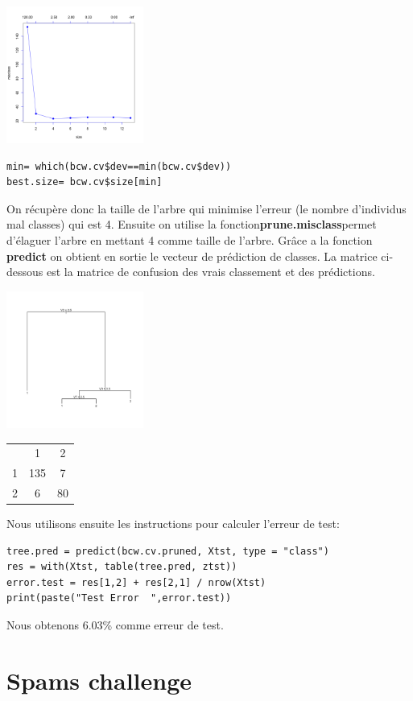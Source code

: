 \documentclass[10pt]{article}
\begin{document}
\begin{minipage}{.4\textwidth}
	\includegraphics[width=45mm]{Figures/bcw_cvplot.png}
\end{minipage}%
\hspace{0.01\linewidth}
\begin{minipage}{.65\textwidth}
 \begin{lstlisting}
min= which(bcw.cv$dev==min(bcw.cv$dev))
best.size= bcw.cv$size[min]
 \end{lstlisting}
\end{minipage}
On récupère donc la taille de l'arbre qui minimise l'erreur (le nombre d'individus mal classes) qui est 4. Ensuite on utilise la fonction\textbf{prune.misclass}permet d’élaguer l’arbre en mettant 4 comme taille de l'arbre. Grâce a la fonction \textbf{predict} on obtient en sortie le vecteur de prédiction de classes. La matrice ci-dessous est la matrice de confusion des vrais classement et des prédictions.
\begin{minipage}{.5\textwidth}
	\includegraphics[width=45mm]{Figures/bcw_prunedtree.png}
\end{minipage}%
\hspace{0.00\linewidth}
\begin{minipage}{.4\textwidth}
\begin{tabular}{c  c c}
  & 1  &  2 \\
1 & 135 &   7 \\
2 &  6&  80
\end{tabular}
\end{minipage}

Nous utilisons ensuite les instructions pour calculer l'erreur de test:
\begin{lstlisting}
tree.pred = predict(bcw.cv.pruned, Xtst, type = "class")
res = with(Xtst, table(tree.pred, ztst))
error.test = res[1,2] + res[2,1] / nrow(Xtst)
print(paste("Test Error  ",error.test))
\end{lstlisting}

Nous obtenons 6.03\% comme erreur de test.




\section{Spams challenge}
\end{document}
